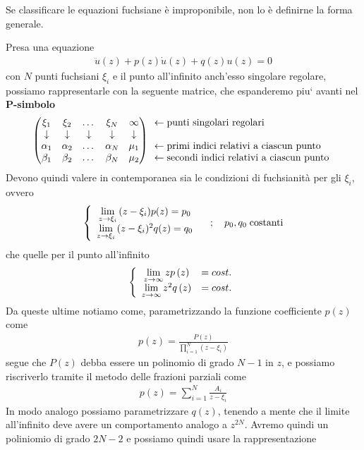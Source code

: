 Se classificare le equazioni fuchsiane è improponibile, non lo è definirne la forma generale.

Presa una equazione
\begin{align}
	\ddot{u}(z) + p(z)\dot{u}(z) + q(z)u(z) = 0
\end{align}
con $N$ punti fuchsiani $\xi_i$ e il punto all'infinito anch'esso singolare regolare, possiamo rappresentarle con la seguente matrice, che espanderemo piu` avanti nel \textbf{P-simbolo}
\begin{align}
	\begin{pmatrix}
		\xi_1 & \xi_2 & \dots & \xi_N & \infty\\
		\downarrow & \downarrow & \downarrow & \downarrow & \downarrow\\
		\alpha_1 & \alpha_2 & \dots & \alpha_N & \mu_1\\
		\beta_1 & \beta_2 & \dots & \beta_N & \mu_2
	\end{pmatrix} \begin{array}{c}
	\leftarrow \text{punti singolari regolari} \hfill \\
	\\
	\leftarrow \text{primi indici relativi a ciascun punto}\hfill\\
	\leftarrow \text{secondi indici relativi a ciascun punto}
\end{array}
\end{align}
Devono quindi valere in contemporanea sia le condizioni di fuchsianità per gli $\xi_i$, ovvero
\begin{align}
	\left\{ \begin{array}{cc} \underset{z \rightarrow \xi_i}{\lim} \, (z-\xi_i)p(z) = p_0\\ \underset{z \rightarrow \xi_i}{\lim} \, (z-\xi_i)^2 q(z)= q_0 \end{array} \right. \quad ; \quad p_0, q_0 \; \text{costanti} \label{omegakek}
\end{align}
che quelle per il punto all'infinito
\begin{align}
	\double{\limit{z}{\infty}zp\left(z\right) &= cost. \hfill}{\limit{z}{\infty} z^2 q\left(z\right) &= cost.}
\end{align}
Da queste ultime notiamo come, parametrizzando la funzione coefficiente $p(z)$ come 
\begin{align}
	p(z) = \frac{P(z)}{\prod_{i=1}^{N}(z-\xi_i)}
\end{align}
segue che $P(z)$ debba essere un polinomio di grado $N-1$ in $z$, e possiamo riscriverlo tramite il metodo delle frazioni parziali come
\begin{align}
	p(z) = \sum_{i=1}^{N} \frac{A_i}{z-\xi_i}
\end{align}
In modo analogo possiamo parametrizzare $q(z)$, tenendo a mente che il limite all'infinito deve avere un comportamento analogo a $z^{2N}$. Avremo quindi un poliniomio di grado $2N-2$ e possiamo quindi usare la rappresentazione
